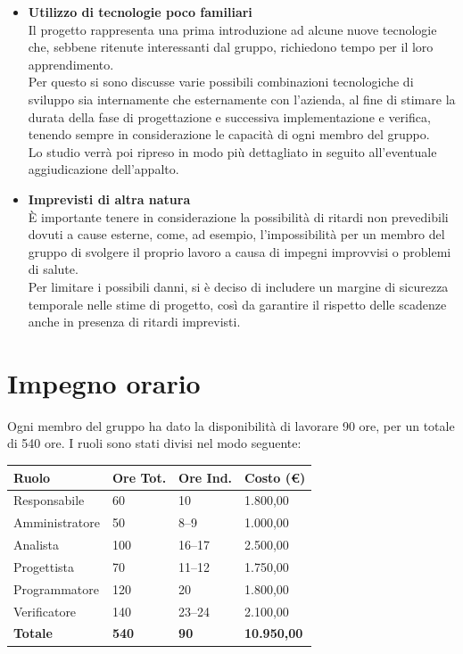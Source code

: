 \documentclass[a4paper,10pt]{article}
\begin{document}
\begin{itemize}
\item\textbf{Utilizzo di tecnologie poco familiari}\\
Il progetto rappresenta una prima introduzione ad alcune nuove tecnologie che, sebbene ritenute interessanti dal gruppo, richiedono tempo per il loro apprendimento.\\
Per questo si sono discusse varie possibili combinazioni tecnologiche di sviluppo sia internamente che esternamente con l'azienda, al fine di stimare la durata della fase di progettazione e successiva implementazione e verifica, tenendo sempre in considerazione le capacità di ogni membro del gruppo.\\
Lo studio verrà poi ripreso in modo più dettagliato in seguito all'eventuale aggiudicazione dell'appalto.
\item\textbf{Imprevisti di altra natura}\\
È importante tenere in considerazione la possibilità di ritardi non prevedibili dovuti a cause esterne, come, ad esempio, l'impossibilità per un membro del gruppo di svolgere il proprio lavoro a causa di impegni improvvisi o problemi di salute.\\
Per limitare i possibili danni, si è deciso di includere un margine di sicurezza temporale nelle stime di progetto, così da garantire il rispetto delle scadenze anche in presenza di ritardi imprevisti. 

\end{itemize}


\section*{Impegno orario}
Ogni membro del gruppo ha dato la disponibilità di lavorare 90 ore, per un totale di 540 ore. I ruoli sono stati divisi nel modo seguente:
\begin{table}[h!]
\centering
\begin{tabular}{|p{2.7cm}|M{1.6cm}|M{1.6cm}|p{2.1cm}|}
  \hline
  \textbf{Ruolo} & \textbf{Ore Tot.} & \textbf{Ore Ind.} &  \textbf\textbf{Costo (€)} \\
  \hline
  Responsabile & 60 & 10 & 1.800,00\\
  \hline
  Amministratore & 50 & 8--9 & 1.000,00\\
  \hline
  Analista & 100 & 16--17 & 2.500,00\\
  \hline
  Progettista & 70 & 11--12 & 1.750,00\\
  \hline
  Programmatore & 120 & 20 & 1.800,00\\
  \hline
  Verificatore & 140 & 23--24 & 2.100,00\\
  \hline
  \textbf{Totale} & \textbf{540} & \textbf{90} & \textbf{10.950,00}\\
  \hline
\end{tabular}
\end{table}
\end{document}
